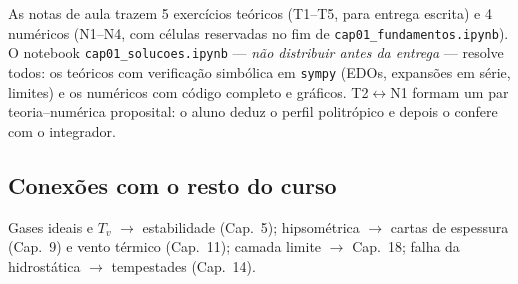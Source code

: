 As notas de aula trazem 5 exercícios teóricos (T1--T5, para entrega escrita)
e 4 numéricos (N1--N4, com células reservadas no fim de
\texttt{cap01\_fundamentos.ipynb}). O notebook
\texttt{cap01\_solucoes.ipynb} --- \emph{não distribuir antes da entrega} ---
resolve todos: os teóricos com verificação simbólica em \texttt{sympy}
(EDOs, expansões em série, limites) e os numéricos com código completo e
gráficos. T2$\leftrightarrow$N1 formam um par teoria--numérica proposital:
o aluno deduz o perfil politrópico e depois o confere com o integrador.

\subsection*{Conexões com o resto do curso}

Gases ideais e $T_v$ $\to$ estabilidade (Cap.~5); hipsométrica $\to$ cartas
de espessura (Cap.~9) e vento térmico (Cap.~11); camada limite $\to$
Cap.~18; falha da hidrostática $\to$ tempestades (Cap.~14).
